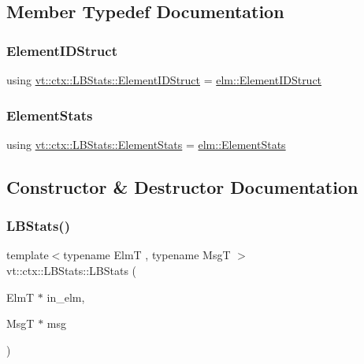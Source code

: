 \subsection{Member Typedef Documentation}
\mbox{\label{structvt_1_1ctx_1_1_l_b_stats_a2ba0297a3c99e495b74b73abbf888bde}} 
\subsubsection{\texorpdfstring{Element\+I\+D\+Struct}{ElementIDStruct}}
{\footnotesize\ttfamily using \hyperlink{structvt_1_1ctx_1_1_l_b_stats_a2ba0297a3c99e495b74b73abbf888bde}{vt\+::ctx\+::\+L\+B\+Stats\+::\+Element\+I\+D\+Struct} =  \hyperlink{structvt_1_1elm_1_1_element_i_d_struct}{elm\+::\+Element\+I\+D\+Struct}}

\mbox{\label{structvt_1_1ctx_1_1_l_b_stats_ae1eb05f8cd4ad63a08ff3cf87ef34e1d}} 
\subsubsection{\texorpdfstring{Element\+Stats}{ElementStats}}
{\footnotesize\ttfamily using \hyperlink{structvt_1_1ctx_1_1_l_b_stats_ae1eb05f8cd4ad63a08ff3cf87ef34e1d}{vt\+::ctx\+::\+L\+B\+Stats\+::\+Element\+Stats} =  \hyperlink{structvt_1_1elm_1_1_element_stats}{elm\+::\+Element\+Stats}}



\subsection{Constructor \& Destructor Documentation}
\mbox{\label{structvt_1_1ctx_1_1_l_b_stats_aa1212c9a206b738a146981acbc48327d}} 
\subsubsection{\texorpdfstring{L\+B\+Stats()}{LBStats()}\hspace{0.1cm}{\footnotesize\ttfamily [1/2]}}
{\footnotesize\ttfamily template$<$typename ElmT , typename MsgT $>$ \\
vt\+::ctx\+::\+L\+B\+Stats\+::\+L\+B\+Stats (\begin{DoxyParamCaption}\item[{ElmT $\ast$}]{in\+\_\+elm,  }\item[{MsgT $\ast$}]{msg }\end{DoxyParamCaption})}



